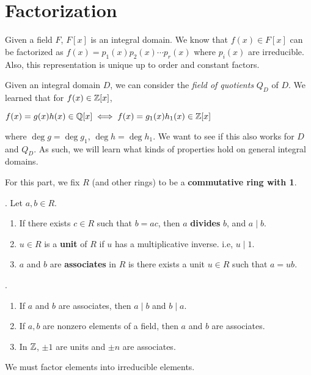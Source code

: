 \setcounter{chapter}{8}
\chapter{Factorization}

Given a field \(F\), \(F[x]\) is an integral domain. We know that \(f(x) \in F[x]\) can be factorized as \(f(x) = p_1(x)p_2(x) \cdots p_r(x)\) where \(p_i(x)\) are irreducible. Also, this representation is unique up to order and constant factors.

Given an integral domain \(D\), we can consider the \textit{field of quotients} \(Q_D\) of \(D\). We learned that for \(f(x) \in \mathbb{Z}[x]\),
\begin{center}
    \(f(x) = g(x)h(x) \in \mathbb{Q}[x] \iff f(x) = g_1(x)h_1(x) \in \mathbb{Z}[x]\)
\end{center}
where \(\deg g = \deg g_1\), \(\deg h = \deg h_1\). We want to see if this also works for \(D\) and \(Q_D\). As such, we will learn what kinds of properties hold on general integral domains.

\medskip

For this part, we fix \(R\) (and other rings) to be a \textbf{commutative ring with 1}.

\setcounter{topic}{44}

. Let \(a, b \in R\).
\begin{enumerate}
    \item If there exists \(c \in R\) such that \(b = ac\), then \(a\) \textbf{divides} \(b\), and \(a \mid b\).
    \item \(u \in R\) is a \textbf{unit} of \(R\) if \(u\) has a multiplicative inverse. i.e, \(u \mid 1\).
    \item \(a\) and \(b\) are \textbf{associates} in \(R\) is there exists a unit \(u \in R\) such that \(a = ub\).
\end{enumerate}

\ex.
\begin{enumerate}
    \item If \(a\) and \(b\) are associates, then \(a \mid b\) and \(b \mid a\).
    \item If \(a, b\) are nonzero elements of a field, then \(a\) and \(b\) are associates.
    \item In \(\mathbb{Z}\), \(\pm 1\) are units and \(\pm n\) are associates.
\end{enumerate}

We must factor elements into irreducible elements.

